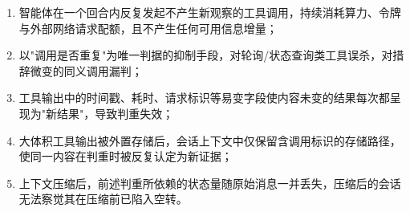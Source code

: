 \documentclass[11pt,UTF8]{ctexart}
\begin{document}
\begin{enumerate}
  \item 智能体在一个回合内反复发起不产生新观察的工具调用，持续消耗算力、令牌与外部网络请求配额，且不产生任何可用信息增量；
  \item 以"调用是否重复"为唯一判据的抑制手段，对轮询/状态查询类工具误杀，对措辞微变的同义调用漏判；
  \item 工具输出中的时间戳、耗时、请求标识等易变字段使内容未变的结果每次都呈现为"新结果"，导致判重失效；
  \item 大体积工具输出被外置存储后，会话上下文中仅保留含调用标识的存储路径，使同一内容在判重时被反复认定为新证据；
  \item 上下文压缩后，前述判重所依赖的状态量随原始消息一并丢失，压缩后的会话无法察觉其在压缩前已陷入空转。
\end{enumerate}

\end{document}
